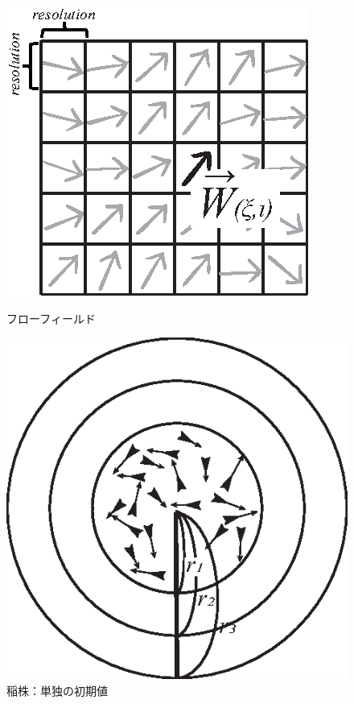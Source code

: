 \documentclass[twocolumn]{jarticle}
\begin{document}
\begin{enumerate}
    \begin{figure}[t]
        \centering
        \begin{minipage}{0.45\linewidth}
            \centering
            \includegraphics[width=\linewidth]{fig/flowfield.eps}
            \caption{フローフィールド}
            \label{fig:flowfield}
        \end{minipage}
        \hfil
        \begin{minipage}{0.45\linewidth}
            \centering
            \includegraphics[width=0.8\linewidth]{fig/kabu_class.eps}
            \caption{稲株：単独の初期値}
            \label{fig:kabu_class}
        \end{minipage}
    \end{figure}
    

\end{enumerate}
\end{document}
